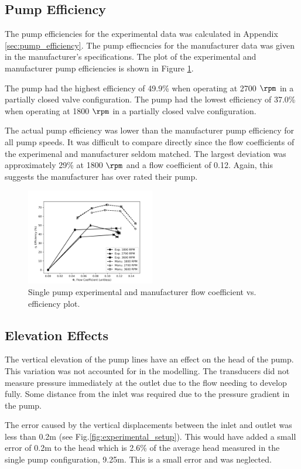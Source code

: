 \subsection{Pump Efficiency}
The pump efficiencies for the experimental data was calculated in Appendix \ref{sec:pump_efficiency}. The pump effiecncies for the manufacturer data was given in the manufacturer's specifications. The plot of the experimental and manufacturer pump efficiencies is shown in Figure \ref{fig:single_pump_efficiency_plot}.

The pump had the highest efficiency of 49.9\% when operating at 2700 $\unit{\rpm}$ in a partially closed valve configuration. The pump had the lowest efficiency of 37.0\% when operating at 1800 $\unit{\rpm}$ in a partially closed valve configuration. 

The actual pump efficiency was lower than the manufacturer pump efficiency for all pump speeds. It was difficult to compare directly since the flow coefficients of the experimenal and manufacturer seldom matched. The largest deviation was approximately 29\% at 1800 $\unit{\rpm}$ and a flow coefficient of 0.12. Again, this suggests the manufacturer has over rated their pump.
\begin{figure}[H]
    \centering
    \includegraphics[width=0.5\textwidth]{Sections/Figures/Single Pump Efficiency Plot.png}
    \caption{Single pump experimental and manufacturer flow coefficient vs. efficiency plot.}
    \label{fig:single_pump_efficiency_plot}
\end{figure}

\subsection{Elevation Effects}
The vertical elevation of the pump lines have an effect on the head of the pump. This variation was not accounted for in the modelling. The transducers did not measure pressure immediately at the outlet due to the flow needing to develop fully. Some distance from the inlet was required due to the pressure gradient in the pump.

The error caused by the vertical displacements between the inlet and outlet was less than 0.2m (see Fig.\ref{fig:experimental_setup}). This would have added a small error of 0.2m to the head which is 2.6\% of the average head measured in the single pump configuration, 9.25m. This is a small error and was neglected.